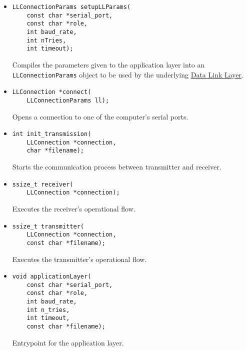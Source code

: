 \documentclass[11pt,a4paper,twocolumn]{article}
\begin{document}
\begin{itemize}
    \item \begin{lstlisting}
LLConnectionParams setupLLParams(
    const char *serial_port, 
    const char *role, 
    int baud_rate, 
    int nTries, 
    int timeout);
    \end{lstlisting}

          Compiles the parameters given to the application layer into an \lstinline{LLConnectionParams} object to be used by the underlying \hyperref[sec:dll]{Data Link Layer}.

    \item \begin{lstlisting}
LLConnection *connect(
    LLConnectionParams ll);
    \end{lstlisting}

          Opens a connection to one of the computer's serial ports.

    \item \begin{lstlisting}
int init_transmission(
    LLConnection *connection, 
    char *filename);
    \end{lstlisting}

          Starts the communication process between transmitter and receiver.

    \item \begin{lstlisting}
ssize_t receiver(
    LLConnection *connection);
    \end{lstlisting}

          Executes the receiver's operational flow.

    \item \begin{lstlisting}
ssize_t transmitter(
    LLConnection *connection, 
    const char *filename);
    \end{lstlisting}

          Executes the transmitter's operational flow.

    \item \begin{lstlisting}
void applicationLayer(
    const char *serial_port, 
    const char *role, 
    int baud_rate, 
    int n_tries, 
    int timeout, 
    const char *filename);
    \end{lstlisting}

          Entrypoint for the application layer.

\end{itemize}
\end{document}
